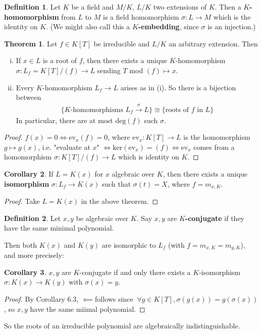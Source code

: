 \documentclass{article}
\theoremstyle{definition}
\newtheorem{theorem}{Theorem}[section]
\newtheorem{cor}[theorem]{Corollary}
\newtheorem{defn}{Definition}[section]
\begin{document}
\begin{defn}
    Let $K$ be a field and $M/K$, $L/K$ two extensions of $K$. Then a \textbf{$K$-homomorphism} from $L$ to $M$ is a field homomorphism $\sigma : L \to M$ which is the identity on $K$. (We might also call this a \textbf{$K$-embedding}, since $\sigma$ is an injection.)
\end{defn}
\begin{theorem}\label{6.2}
    Let $f \in K[T]$ be irreducible and $L/K$ an arbitrary extension. Then
    \begin{enumerate}[(i)]
        \item If $x \in L$ is a root of $f$, then there exists a unique $K$-homomorphism $\sigma : L_f = K[T]/(f) \to L$ sending $T$ mod $(f) \mapsto x$.
        \item Every $K$-homomorphism $L_f \to L$ arises as in (i). So there is a bijection between
        \begin{align*}
            \{K\text{-homomorphisms } L_f \stackrel{\sigma}{\to} L\} \cong \{\text{roots of }f \text{ in }L\}
        \end{align*}
        In particular, there are at most $\text{deg}(f)$ such $\sigma$.
    \end{enumerate}
\end{theorem}
\begin{proof}
    $f(x)=0 \iff \text{ev}_x(f)=0$, where $\text{ev}_x : K[T] \to L$ is the homomorphism $g \mapsto g(x)$, i.e. "evaluate at $x$" $\iff \text{ker}(\text{ev}_x) = (f) \iff \text{ev}_x$ comes from a homomorphism $\sigma : K[T]/(f) \to L$ which is identity on $K$.
\end{proof}
\begin{cor}
    If $L = K(x)$ for $x$ algebraic over $K$, then there exists a unique \textbf{isomorphism} $\sigma : L_f \to K(x)$ such that $\sigma(t)=X$, where $f=m_{x,K}$.  
\end{cor}
\begin{proof}
    Take $L = K(x)$ in the above theorem.
\end{proof}
\begin{defn}
    Let $x,y$ be algebraic over $K$. Say $x,y$ are \textbf{$K$-conjugate}  if they have the same minimal polynomial. 
\end{defn}
Then both $K(x)$ and $K(y)$ are isomorphic to $L_f$ (with $f=m_{x,K}=m_{y,K}$), and more precisely:
\begin{cor}
    $x,y$ are $K$-conjugate if and only there exists a $K$-isomorphism $\sigma : K(x) \to K(y)$ with $\sigma(x)=y$.
\end{cor}
\begin{proof}
    By Corollary 6.3, $\impliedby $follows since $~\forall  g \in K[T], \sigma(g(x))=g(\sigma(x))$, so $x,y$ have the same miimal polynomial.
\end{proof}
So the roots of an irreducible polynomial are algebraically indistinguishable.
\vspace{1mm}
\end{document}
